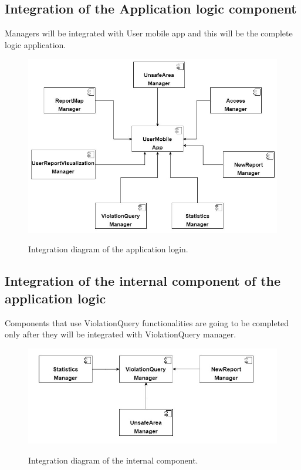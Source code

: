 \documentclass[../RASD.tex]{subfiles}
\begin{document}
    \subsection{Integration of the Application logic component}\label{subsec:integration-of-the-application-logic-component}
    Managers will be integrated with User mobile app and this will be the complete logic application.
    \begin{figure}[H]
        \centering
        \includegraphics[scale = 0.8]{assets/integration_diagrams/user_mobile_app_integration.png}\\[1.6 cm]
        \caption[\textit{Integration} Diagram of the application logic]{Integration diagram of the application login.}
    \end{figure}
    \subsection{Integration of the internal component of the application logic}\label{subsec:integration-of-the-internal-component-of-the-application-logic}
    Components that use ViolationQuery functionalities are going to be completed only after they will be integrated with ViolationQuery manager.
    \\
    \begin{figure}[H]
        \centering
        \includegraphics[scale = 0.8]{assets/integration_diagrams/violation_query_integration.png}\\
        \caption[\textit{Integration} Diagram of the internal component]{Integration diagram of the internal component.}
    \end{figure}
    \newpage
\end{document}
